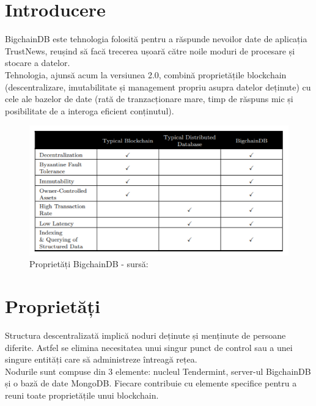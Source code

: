 \section{Introducere}

BigchainDB este tehnologia folosită pentru a răspunde nevoilor date de aplicația TrustNews, reușind să facă trecerea ușoară către noile moduri de procesare și stocare a datelor.\\

Tehnologia, ajunsă acum la versiunea 2.0, combină proprietățile blockchain (descentralizare, imutabilitate și management propriu asupra datelor deținute) cu cele ale bazelor de date (rată de tranzacționare mare, timp de răspuns mic și posibilitate de a interoga eficient conținutul). \cite{BigchainDB_Art}\\

\begin{figure}[H] 
\centering
\includegraphics[scale=1]{Images/BCDB_Props.png}
\caption{Proprietăți BigchainDB - sursă: \cite{BigchainDB_Art}}
\end{figure}

\section{Proprietăți}

Structura descentralizată implică noduri deținute și menținute de persoane diferite. Astfel se elimina necesitatea unui singur punct de control sau a unei singure entități care să administreze întreagă rețea.\\

Nodurile sunt compuse din 3 elemente: nucleul Tendermint, server-ul BigchainDB și o bază de date MongoDB. Fiecare contribuie cu elemente specifice pentru a reuni toate proprietățile unui blockchain.\\

